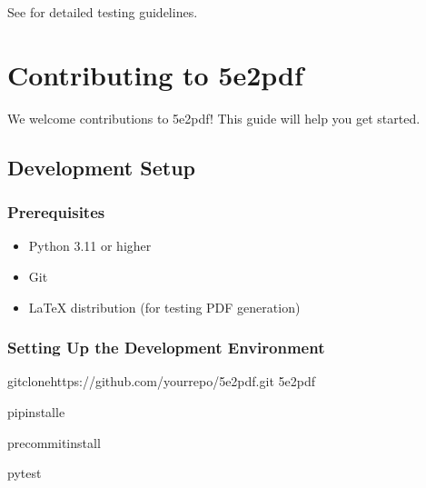 \documentclass[letterpaper,10pt,english]{sphinxmanual}
\begin{document}
\sphinxAtStartPar
See {\hyperref[\detokenize{developer/testing::doc}]{}} for detailed testing guidelines.

\sphinxstepscope


\section{Contributing to 5e2pdf}
\label{\detokenize{developer/contributing:contributing-to-5e2pdf}}\label{\detokenize{developer/contributing::doc}}
\sphinxAtStartPar
We welcome contributions to 5e2pdf! This guide will help you get started.


\subsection{Development Setup}
\label{\detokenize{developer/contributing:development-setup}}

\subsubsection{Prerequisites}
\label{\detokenize{developer/contributing:prerequisites}}\begin{itemize}
\item {} 
\sphinxAtStartPar
Python 3.11 or higher

\item {} 
\sphinxAtStartPar
Git

\item {} 
\sphinxAtStartPar
LaTeX distribution (for testing PDF generation)

\end{itemize}


\subsubsection{Setting Up the Development Environment}
\label{\detokenize{developer/contributing:setting-up-the-development-environment}}
\begin{sphinxVerbatim}[commandchars=\\\{\}]
gitclonehttps://github.com/your\PYGZhy{}repo/5e2pdf.git
5e2pdf

pipinstall\PYGZhy{}e

pre\PYGZhy{}commitinstall

pytest
\end{sphinxVerbatim}
\end{document}
